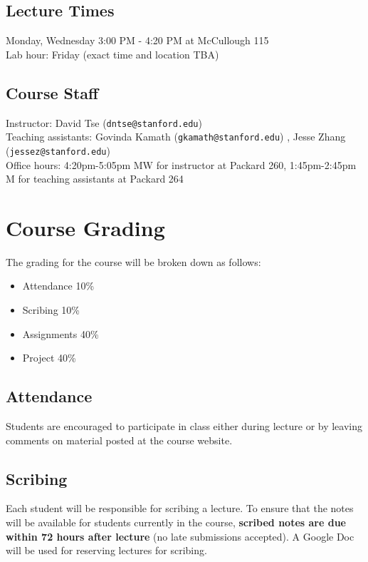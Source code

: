 \documentclass[11pt,onecolumn]{article}
\begin{document}
\subsection*{Lecture Times}
Monday, Wednesday 3:00 PM - 4:20 PM at McCullough 115 \\
Lab hour: Friday (exact time and location TBA)

\subsection*{Course Staff}
Instructor: David Tse (\texttt{dntse@stanford.edu}) \\
Teaching assistants: Govinda Kamath (\texttt{gkamath@stanford.edu}) , Jesse Zhang (\texttt{jessez@stanford.edu}) \\
Office hours: 4:20pm-5:05pm MW for instructor at Packard 260, 1:45pm-2:45pm M for teaching assistants at Packard 264
\pagebreak

\section*{Course Grading}
The grading for the course will be broken down as follows:
\begin{itemize}
	\itemsep0em 
	\item Attendance 10\%
	\item Scribing 10\%
	\item Assignments 40\%
	\item Project 40\%
\end{itemize}

\subsection*{Attendance}
Students are encouraged to participate in class either during lecture or by leaving comments on material posted at the course website.

\subsection*{Scribing}
Each student will be responsible for scribing a lecture. To ensure that the notes will be available for students currently in the course, \textbf{scribed notes are due within 72 hours after lecture} (no late submissions accepted). A Google Doc will be used for reserving lectures for scribing.
\end{document}
